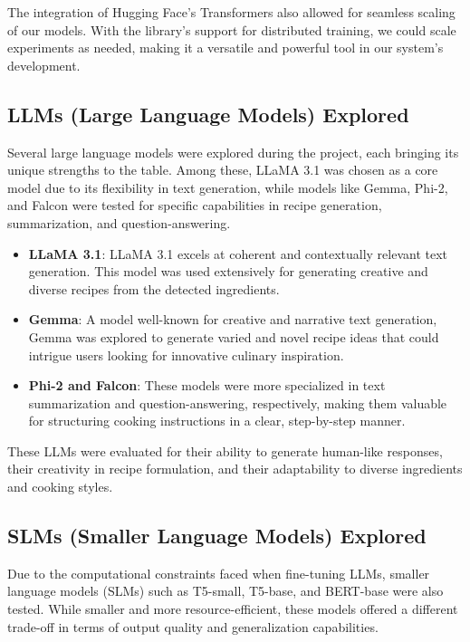 \documentclass[letterpaper,11pt]{report}
\begin{document}
The integration of Hugging Face’s Transformers also allowed for seamless scaling of our models. With the library's support for distributed training, we could scale experiments as needed, making it a versatile and powerful tool in our system's development.

\subsection{LLMs (Large Language Models) Explored}

Several large language models were explored during the project, each bringing its unique strengths to the table. Among these, LLaMA 3.1 was chosen as a core model due to its flexibility in text generation, while models like Gemma, Phi-2, and Falcon were tested for specific capabilities in recipe generation, summarization, and question-answering.

\begin{itemize}
\item \textbf{LLaMA 3.1}: LLaMA 3.1 excels at coherent and contextually relevant text generation. This model was used extensively for generating creative and diverse recipes from the detected ingredients.
\item \textbf{Gemma}: A model well-known for creative and narrative text generation, Gemma was explored to generate varied and novel recipe ideas that could intrigue users looking for innovative culinary inspiration.
\item \textbf{Phi-2 and Falcon}: These models were more specialized in text summarization and question-answering, respectively, making them valuable for structuring cooking instructions in a clear, step-by-step manner.
\end{itemize}

These LLMs were evaluated for their ability to generate human-like responses, their creativity in recipe formulation, and their adaptability to diverse ingredients and cooking styles.

\subsection{SLMs (Smaller Language Models) Explored}

Due to the computational constraints faced when fine-tuning LLMs, smaller language models (SLMs) such as T5-small, T5-base, and BERT-base were also tested. While smaller and more resource-efficient, these models offered a different trade-off in terms of output quality and generalization capabilities.
\end{document}
